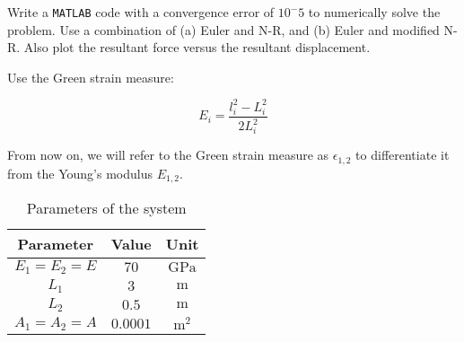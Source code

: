 Write a \texttt{MATLAB} code with a convergence error of $10^-5$ to numerically solve the problem.
Use a combination of (a) Euler and N-R, and (b) Euler and modified N-R.
Also plot the resultant force versus the resultant displacement.

Use the Green strain measure:

\begin{equation}
    E_i = \frac{l_i^2 - L_i^2}{2L_i^2}
    \label{eq:green_strain_measure_formula}
\end{equation}

From now on, we will refer to the Green strain measure as $\epsilon_{1,2}$ to differentiate it from the Young's modulus $E_{1,2}$.

\begin{table}[H]
    \centering
    \begin{tabular}{|c|c|c|}
        \hline
        \textbf{Parameter} & \textbf{Value} & \textbf{Unit} \\ \hline
        $E_1 = E_2 = E$    & $70$           & $\text{GPa}$  \\ \hline
        $L_1$              & $3$            & $\text{m}$    \\ \hline
        $L_2$              & $0.5$          & $\text{m}$    \\ \hline
        $A_1 = A_2 = A$    & $0.0001$       & $\text{m}^2$  \\ \hline
    \end{tabular}
    \caption{Parameters of the system}
    \label{tab:parameters_of_the_system}
\end{table}
